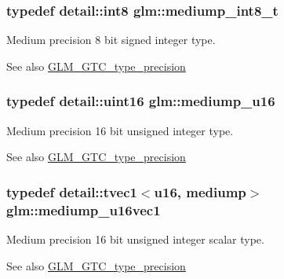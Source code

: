 \subsubsection[{\texorpdfstring{mediump\+\_\+int8\+\_\+t}{mediump_int8_t}}]{\setlength{\rightskip}{0pt plus 5cm}typedef detail\+::int8 {\bf glm\+::mediump\+\_\+int8\+\_\+t}}\hypertarget{group__gtc__type__precision_ga626ac5f73d3538e62a879d6c56abfb36}{}\label{group__gtc__type__precision_ga626ac5f73d3538e62a879d6c56abfb36}
Medium precision 8 bit signed integer type. \begin{DoxySeeAlso}{See also}
\hyperlink{group__gtc__type__precision}{G\+L\+M\+\_\+\+G\+T\+C\+\_\+type\+\_\+precision} 
\end{DoxySeeAlso}
\subsubsection[{\texorpdfstring{mediump\+\_\+u16}{mediump_u16}}]{\setlength{\rightskip}{0pt plus 5cm}typedef detail\+::uint16 {\bf glm\+::mediump\+\_\+u16}}\hypertarget{group__gtc__type__precision_ga6745262ef6a6fdb8637b2387ef924828}{}\label{group__gtc__type__precision_ga6745262ef6a6fdb8637b2387ef924828}
Medium precision 16 bit unsigned integer type. \begin{DoxySeeAlso}{See also}
\hyperlink{group__gtc__type__precision}{G\+L\+M\+\_\+\+G\+T\+C\+\_\+type\+\_\+precision} 
\end{DoxySeeAlso}
\subsubsection[{\texorpdfstring{mediump\+\_\+u16vec1}{mediump_u16vec1}}]{\setlength{\rightskip}{0pt plus 5cm}typedef detail\+::tvec1$<$u16, mediump$>$ {\bf glm\+::mediump\+\_\+u16vec1}}\hypertarget{group__gtc__type__precision_gacb35d25d662b2a6396d094197ca834f0}{}\label{group__gtc__type__precision_gacb35d25d662b2a6396d094197ca834f0}
Medium precision 16 bit unsigned integer scalar type. \begin{DoxySeeAlso}{See also}
\hyperlink{group__gtc__type__precision}{G\+L\+M\+\_\+\+G\+T\+C\+\_\+type\+\_\+precision} 
\end{DoxySeeAlso}
